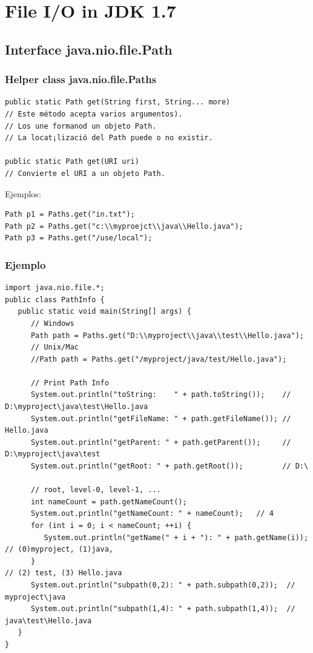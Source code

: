 \documentclass{beamer}
\begin{document}
\section{File I/O in JDK 1.7}
\subsection{Interface java.nio.file.Path}
\begin{frame}[fragile]
\frametitle{Helper class java.nio.file.Paths}
\begin{verbatim}
public static Path get(String first, String... more)
// Este método acepta varios argumentos).
// Los une formanod un objeto Path.
// La locat¡lizació del Path puede o no existir.  
  
public static Path get(URI uri)
// Convierte el URI a un objeto Path.
\end{verbatim}
Ejemplos:
\begin{verbatim}
Path p1 = Paths.get("in.txt");     
Path p2 = Paths.get("c:\\myproejct\\java\\Hello.java");  
Path p3 = Paths.get("/use/local");  
\end{verbatim}
\end{frame}

\begin{frame}[fragile]
\frametitle{Ejemplo}
\begin{tiny}
\begin{verbatim}
import java.nio.file.*;
public class PathInfo {
   public static void main(String[] args) {
      // Windows
      Path path = Paths.get("D:\\myproject\\java\\test\\Hello.java");
      // Unix/Mac
      //Path path = Paths.get("/myproject/java/test/Hello.java");
 
      // Print Path Info
      System.out.println("toString:    " + path.toString());    // D:\myproject\java\test\Hello.java
      System.out.println("getFileName: " + path.getFileName()); // Hello.java
      System.out.println("getParent: " + path.getParent());     // D:\myproject\java\test
      System.out.println("getRoot: " + path.getRoot());         // D:\
 
      // root, level-0, level-1, ...
      int nameCount = path.getNameCount();
      System.out.println("getNameCount: " + nameCount);   // 4
      for (int i = 0; i < nameCount; ++i) {
         System.out.println("getName(" + i + "): " + path.getName(i)); // (0)myproject, (1)java,
      }                                                                // (2) test, (3) Hello.java
      System.out.println("subpath(0,2): " + path.subpath(0,2));  // myproject\java
      System.out.println("subpath(1,4): " + path.subpath(1,4));  // java\test\Hello.java
   }
}
\end{verbatim}
\end{tiny}
\end{frame}
\end{document}
